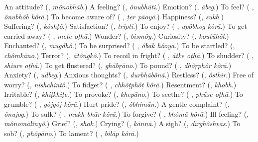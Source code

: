 \begin{tcolorbox}[breakable,colback=teal!4,colframe=teal!35!black,title={Before you move on}]
An attitude? (\textbf{}, \emph{mônobhāb}.) A feeling? (\textbf{}, \emph{ônubhūti}.) Emotion? (\textbf{}, \emph{ābeg}.) To feel? (\textbf{ }, \emph{ônubhôb kôrā}.) To become aware of? (\textbf{ }, \emph{ṭer pāoyā}.) Happiness? (\textbf{}, \emph{sukh}.) Suffering? (\textbf{}, \emph{kôshṭô}.) Satisfaction? (\textbf{}, \emph{tripti}.) To enjoy? (\textbf{ }, \emph{upôbhog kôrā}.) To get carried away? (\textbf{ }, \emph{mete oṭhā}.) Wonder? (\textbf{}, \emph{bismôy}.) Curiosity? (\textbf{}, \emph{koutūhôl}.) Enchanted? (\textbf{}, \emph{mugdhô}.) To be surprised? (\textbf{ }, \emph{ôbāk hôoyā}.) To be startled? (\textbf{}, \emph{chômkāno}.) Terror? (\textbf{}, \emph{ātôngkô}.) To recoil in fright? (\textbf{ }, \emph{ā̃tke oṭhā}.) To shudder? (\textbf{ }, \emph{shiure oṭhā}.) To get flustered? (\textbf{}, \emph{ghābṛāno}.) To pound? (\textbf{ }, \emph{dhôṛphôṛ kôrā}.) Anxiety? (\textbf{}, \emph{udbeg}.) Anxious thoughts? (\textbf{}, \emph{durbhābônā}.) Restless? (\textbf{}, \emph{ôsthir}.) Free of worry? (\textbf{}, \emph{nishchintô}.) To fidget? (\textbf{ }, \emph{chhôṭphôṭ kôrā}.) Resentment? (\textbf{}, \emph{khobh}.) Irritable? (\textbf{}, \emph{khiṭkhiṭe}.) To provoke? (\textbf{}, \emph{khepāno}.) To seethe? (\textbf{ }, \emph{phũse oṭhā}.) To grumble? (\textbf{ }, \emph{gôjgôj kôrā}.) Hurt pride? (\textbf{}, \emph{ôbhimān}.) A gentle complaint? (\textbf{}, \emph{ônujog}.) To sulk? (\textbf{  }, \emph{mukh bhār kôrā}.) To forgive? (\textbf{ }, \emph{khômā kôrā}.) Ill feeling? (\textbf{}, \emph{mônomālinyô}.) Grief? (\textbf{}, \emph{shok}.) Crying? (\textbf{}, \emph{kānnā}.) A sigh? (\textbf{}, \emph{dīrghôshvās}.) To sob? (\textbf{}, \emph{phõpāno}.) To lament? (\textbf{ }, \emph{bilāp kôrā}.)
\end{tcolorbox}
